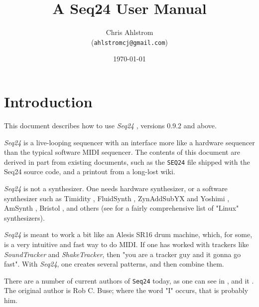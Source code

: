 \documentclass[
 11pt,
 twoside,
 a4paper,
 headinclude,
 footinclude,
 final                                 %
]{article}
\begin{document}
\title{A Seq24 User Manual}
\author{Chris Ahlstrom\\
   (\texttt{ahlstromcj@gmail.com})}
\date{\today}
\maketitle
\tableofcontents
\listoffigures                         %


\setlength{\parindent}{0pt}
\setlength{\parskip}{1ex plus 0.5ex minus 0.2ex}

\section{Introduction}
\label{sec:introduction}

   This document describes how to use \textsl{Seq24} \cite{seq24},
   versions 0.9.2 and above.

   \textsl{Seq24} is
   a live-looping sequencer with an interface more like a hardware sequencer
   than the typical software MIDI sequencer.  The contents of this document
   are derived in part from existing documents, such as the \texttt{SEQ24}
   file shipped with the Seq24 source code, and a printout from a
   long-lost wiki.

   \textsl{Seq24} is not a synthesizer.  One needs hardware synthesizer, or
   a software synthesizer such as
   Timidity \cite{timidity},
   FluidSynth \cite{fluidsynth},
   ZynAddSubYX \cite{zynaddsubfx} and Yoshimi \cite{yoshimi} \cite{yoshimi2},
   AmSynth \cite{amsynth},
   Bristol \cite{bristol},
   and others (see \cite{linuxsynths} for a fairly comprehensive list of
   "Linux" synthesizers).

   \textsl{Seq24} is meant to work a bit like an Alesis SR16 drum machine,
   which, for some, is a very intuitive and fast way to do MIDI.
   If one has worked with trackers like \textsl{SoundTracker} and
   \textsl{ShakeTracker}, then "you are a tracker guy and it gonna go fast".
   With \textsl{Seq24}, one creates several patterns, and then combine them.

   There are a number of current authors of \texttt{Seq24} today,
   as one can see in
   ,
   and it
   .
   The original author is Rob C. Buse; where the word "I" occurs, that is
   probably him.
\end{document}
